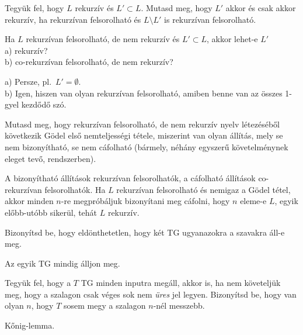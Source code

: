 \begin{Exercise}[counter={sorszam}, difficulty=0]
	Tegy\"uk fel, hogy $L$ rekurz\'iv \'es $L'\subset L$. Mutasd meg, hogy $L'$ akkor \'es csak akkor rekurz\'iv, ha rekurz\'ivan felsorolhat\'o \'es $L\setminus L'$ is rekurz\'ivan felsorolhat\'o. 
\end{Exercise}	


\begin{Exercise}[counter={sorszam}, difficulty=0]
	Ha $L$ rekurz\'ivan felsorolhat\'o, de nem rekurz\'iv \'es $L'\subset L$, akkor lehet-e $L'$\\
	a) rekurz\'iv?\\
	b) co-rekurz\'ivan felsorolhat\'o, de nem rekurz\'iv?
\end{Exercise}	
\begin{Answer}
	a) Persze, pl.\ $L'=\emptyset$.\\
	b) Igen, hiszen van olyan rekurz\'ivan felsorolhat\'o, amiben benne van az \"osszes 1-gyel kezd\H od\H o sz\'o.
\end{Answer}


\begin{Exercise}[counter={sorszam}, difficulty=0]
	Mutasd meg, hogy rekurz\'ivan felsorolhat\'o, de nem rekurz\'iv nyelv l\'etez\'es\'eb\H ol k\"ovetkezik G\"odel els\H o nemteljess\'egi t\'etele, miszerint van olyan \'all\'it\'as, mely se nem bizony\'ithat\'o, se nem c\'afolhat\'o (b\'armely, n\'eh\'any egyszer\H u k\"ovetelm\'enynek eleget tev\H o, rendszerben).
\end{Exercise}	
\begin{Answer}
	A bizony\'ithat\'o \'all\'it\'asok rekurz\'ivan felsorolhat\'ok, a c\'afolhat\'o \'all\'it\'asok co-rekurz\'ivan felsorolhat\'ok. Ha $L$ rekurz\'ivan felsorolhat\'o \'es nemigaz a G\"odel t\'etel, akkor minden $n$-re megpr\'ob\'aljuk bizony\'itani meg c\'afolni, hogy $n$ eleme-e $L$, egyik el\H obb-ut\'obb siker\"ul, teh\'at $L$ rekurz\'iv.
\end{Answer}


\begin{Exercise}[counter={sorszam}, difficulty=0]
	Bizonyítsd be, hogy eldönthetetlen, hogy két TG ugyanazokra a szavakra áll-e meg.
\end{Exercise}	
\begin{Answer}
	Az egyik TG mindig \'alljon meg.
\end{Answer}

\begin{Exercise}[counter={sorszam}, difficulty=0]
	Tegyük fel, hogy a $T$ TG minden inputra megáll, akkor is, ha nem követeljük meg, hogy a szalagon csak véges sok nem {\em üres} jel legyen. Bizonyítsd be, hogy van olyan $n$, hogy $T$ sosem megy a szalagon $n$-nél messzebb.
\end{Exercise}	
\begin{Answer}
	K\H onig-lemma.
\end{Answer}

